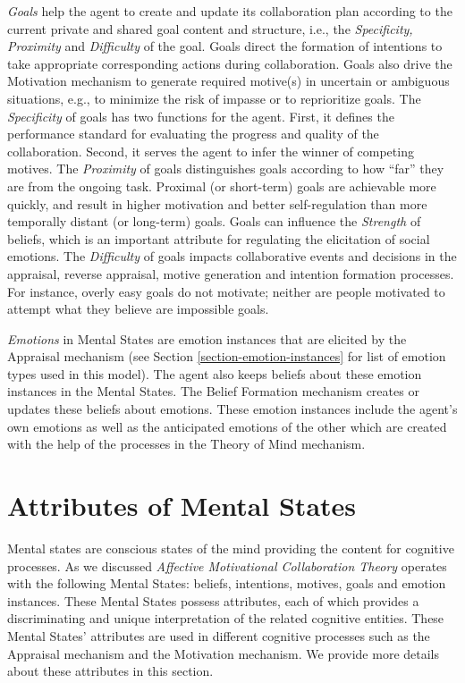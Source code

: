 \documentclass[12pt]{report}
\begin{document}
\textit{Goals} help the agent to create and update its collaboration plan
according to the current private and shared goal content and structure, i.e.,
the \textit{Specificity, Proximity} and \textit{Difficulty} of the goal. Goals
direct the formation of intentions to take appropriate corresponding actions
during collaboration. Goals also drive the Motivation mechanism to generate
required motive(s) in uncertain or ambiguous situations, e.g., to minimize the
risk of impasse or to reprioritize goals. The \textit{Specificity} of goals has
two functions for the agent. First, it defines the performance standard for
evaluating the progress and quality of the collaboration. Second, it serves the
agent to infer the winner of competing motives. The \textit{Proximity} of goals
distinguishes goals according to how ``far'' they are from the ongoing task.
Proximal (or short-term) goals are achievable more quickly, and result in higher
motivation and better self-regulation than more temporally distant (or
long-term) goals. Goals can influence the \textit{Strength} of beliefs, which is
an important attribute for regulating the elicitation of social emotions. The
\textit{Difficulty} of goals impacts collaborative events and decisions in the
appraisal, reverse appraisal, motive generation and intention formation
processes. For instance, overly easy goals do not motivate; neither are people
motivated to attempt what they believe are impossible goals.

\textit{Emotions} in Mental States are emotion instances that are elicited by
the Appraisal mechanism (see Section \ref{section-emotion-instances} for list of
emotion types used in this model). The agent also keeps beliefs about these
emotion instances in the Mental States. The Belief Formation mechanism creates
or updates these beliefs about emotions. These emotion instances include the
agent's own emotions as well as the anticipated emotions of the other which are
created with the help of the processes in the Theory of Mind mechanism.

\section{Attributes of Mental States}
\label{sec:mental-states-attributes}

Mental states are conscious states of the mind providing the content for
cognitive processes. As we discussed \textit{Affective Motivational
Collaboration Theory} operates with the following Mental States: beliefs,
intentions, motives, goals and emotion instances. These Mental States possess
attributes, each of which provides a discriminating and unique interpretation of
the related cognitive entities. These Mental States' attributes are used in
different cognitive processes such as the Appraisal mechanism and the Motivation
mechanism. We provide more details about these attributes in this section.
\end{document}
